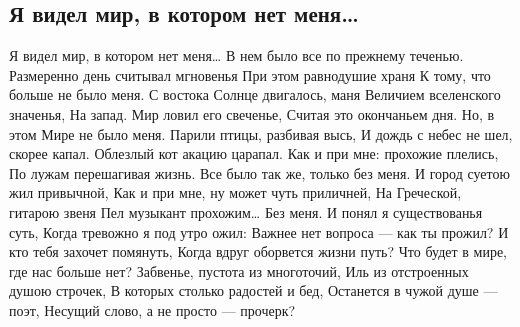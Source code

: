  
 
 

\subsection{Я видел мир, в котором нет меня…}
\label{sec:08_11_2020.fb.evgeniy_maslov.1.mir_bez_menja}


Я видел мир, в котором нет меня…
В нем было все по прежнему теченью.
Размеренно день считывал мгновенья
При этом равнодушие храня
К тому, что больше не было меня. 
С востока Солнце двигалось, маня
Величием вселенского значенья,
На запад. Мир ловил его свеченье,
Считая это окончаньем дня.
Но, в этом Мире не было меня.
Парили птицы, разбивая высь,
И дождь с небес не шел, скорее капал.
Облезлый кот акацию царапал.
Как и при мне: прохожие плелись,
По лужам перешагивая жизнь.
Все было так же, только без меня.
И город суетою жил привычной,
Как и при мне, ну может чуть приличней,
На Греческой, гитарою звеня
Пел музыкант прохожим… Без меня.
И понял я существованья суть,
Когда тревожно я под утро ожил:
Важнее нет вопроса --- как ты прожил?
И кто тебя захочет помянуть,
Когда вдруг оборвется жизни путь?
Что будет в мире, где нас больше нет?
Забвенье, пустота из многоточий,
Иль из отстроенных душою строчек,
В которых столько радостей и бед,
Останется в чужой душе --- поэт,
Несущий слово, а не просто --- прочерк?
